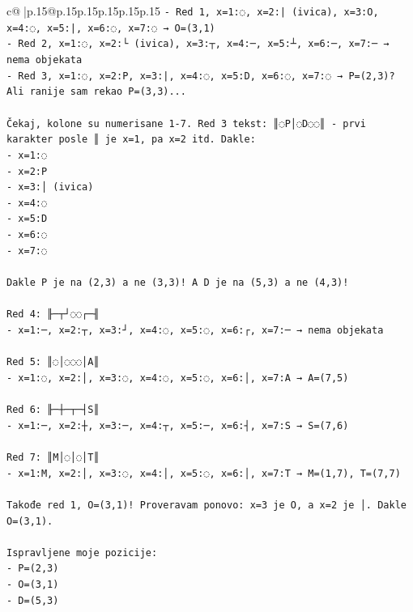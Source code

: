 \documentclass{article}
\begin{document}
{\begin{supertabular}{c@{$\;$}|p{.15\linewidth}@{}p{.15\linewidth}p{.15\linewidth}p{.15\linewidth}p{.15\linewidth}p{.15\linewidth}}
{{{\texttt{{-} Red 1, x=1:◌, x=2:| (ivica), x=3:O, x=4:◌, x=5:|, x=6:◌, x=7:◌  → O=(3,1)} \\
\texttt{{-} Red 2, x=1:◌, x=2:└ (ivica), x=3:┬, x=4:─, x=5:┴, x=6:─, x=7:─ → nema objekata} \\
\texttt{{-} Red 3, x=1:◌, x=2:P, x=3:|, x=4:◌, x=5:D, x=6:◌, x=7:◌ → P=(2,3)? Ali ranije sam rekao P=(3,3)... } \\
\\ 
\texttt{Čekaj, kolone su numerisane 1{-}7. Red 3 tekst: ║◌P│◌D◌◌║ {-} prvi karakter posle ║ je x=1, pa x=2 itd. Dakle:} \\
\texttt{{-} x=1:◌} \\
\texttt{{-} x=2:P} \\
\texttt{{-} x=3:│ (ivica)} \\
\texttt{{-} x=4:◌} \\
\texttt{{-} x=5:D} \\
\texttt{{-} x=6:◌} \\
\texttt{{-} x=7:◌} \\
\\ 
\texttt{Dakle P je na (2,3) a ne (3,3)! A D je na (5,3) a ne (4,3)!} \\
\\ 
\texttt{Red 4: ╟─┬┘◌◌┌─╢} \\
\texttt{{-} x=1:─, x=2:┬, x=3:┘, x=4:◌, x=5:◌, x=6:┌, x=7:─ → nema objekata} \\
\\ 
\texttt{Red 5: ║◌│◌◌◌│A║} \\
\texttt{{-} x=1:◌, x=2:│, x=3:◌, x=4:◌, x=5:◌, x=6:│, x=7:A → A=(7,5)} \\
\\ 
\texttt{Red 6: ╟─┼─┬─┤S║} \\
\texttt{{-} x=1:─, x=2:┼, x=3:─, x=4:┬, x=5:─, x=6:┤, x=7:S → S=(7,6)} \\
\\ 
\texttt{Red 7: ║M│◌│◌│T║} \\
\texttt{{-} x=1:M, x=2:│, x=3:◌, x=4:│, x=5:◌, x=6:│, x=7:T → M=(1,7), T=(7,7)} \\
\\ 
\texttt{Takođe red 1, O=(3,1)! Proveravam ponovo: x=3 je O, a x=2 je │. Dakle O=(3,1).} \\
\\ 
\texttt{Ispravljene moje pozicije:} \\
\texttt{{-} P=(2,3)} \\
\texttt{{-} O=(3,1)} \\
\texttt{{-} D=(5,3)} \\
}}}
\end{supertabular}}
\end{document}
